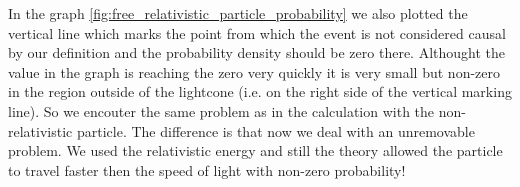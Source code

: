 \clearpage

In the graph \ref{fig:free_relativistic_particle_probability} we also plotted the vertical line which marks the point from which 
the event is not considered causal by our definition and the probability density should be zero there. Althought the value
in the graph is reaching the zero very quickly it is very small but non-zero in the region outside of the lightcone (i.e. on the 
right side of the vertical marking line). So we encouter the same problem as in the calculation with the non-relativistic
particle. The difference is that now we deal with an unremovable problem. We used the relativistic energy and still the theory
allowed the particle to travel faster then the speed of light with non-zero probability!
